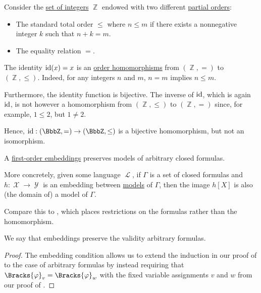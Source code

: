 \begin{example}\label{ex:bijective_order_homomorphism_not_isomorphism}
  Consider the \hyperref[def:integers]{set of integers} \( \BbbZ \) endowed with two different \hyperref[def:partially_ordered_set]{partial orders}:
  \begin{itemize}
    \item The standard total order \( \leq \) where \( n \leq m \) if there exists a nonnegative integer \( k \) such that \( n + k = m \).
    \item The equality relation \( = \).
  \end{itemize}

  The identity \( \operatorname{id}(x) = x \) is an \hyperref[def:order_homomorphism]{order homomorphisms} from \( (\BbbZ, =) \) to \( (\BbbZ, \leq) \). Indeed, for any integers \( n \) and \( m \), \( n = m \) implies \( n \leq m \).

  Furthermore, the identity function is bijective. The inverse of \( \operatorname{id} \), which is again \( \operatorname{id} \), is not however a homomorphism from \( (\BbbZ, \leq) \) to \( (\BbbZ, =) \) since, for example, \( 1 \leq 2 \), but \( 1 \neq 2 \).

  Hence, \( \id: (\BbbZ, =) \to (\BbbZ, \leq) \) is a bijective homomorphism, but not an isomorphism.
\end{example}

\begin{proposition}\label{thm:arbitrary_formulas_preserved_under_isomorphisms}
  A \hyperref[def:first_order_embedding]{first-order embeddings} preserves models of arbitrary closed formulas.

  More concretely, given some language \( \mscrL \), if \( \Gamma \) is a set of closed formulas and \( h: \mscrX \to \mscrY \) is an embedding between \hyperref[def:first_order_model]{models} of \( \Gamma \), then the image \( h[X] \) is also (the domain of) a model of \( \Gamma \).
\end{proposition}
\begin{comments}
  \item Compare this to , which places restrictions on the formulas rather than the homomorphism.
  \item We say that embeddings preserve the validity arbitrary formulas.
\end{comments}
\begin{proof}
  The embedding condition allows us to extend the induction in our proof of  to the case of arbitrary formulas by instead requiring that \( \Bracks{\varphi}_v = \Bracks{\varphi}_w \) with the fixed variable assignments \( v \) and \( w \) from our proof of .
\end{proof}


